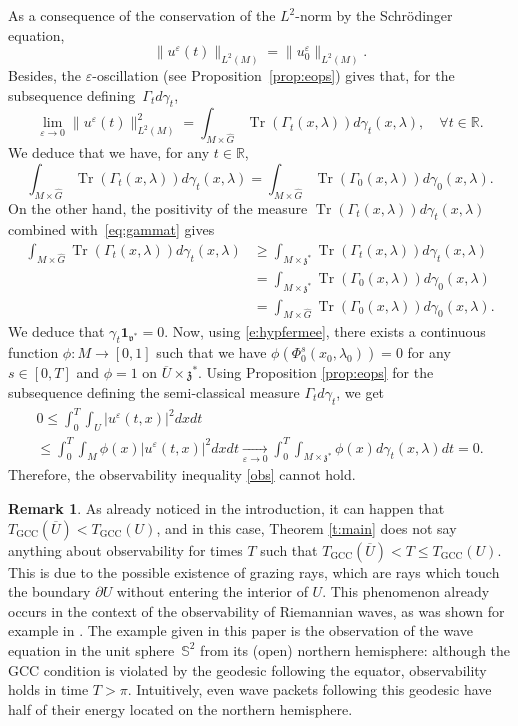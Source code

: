 \documentclass[JEP,XML,SOM,Unicode,published]{cedram}
\newcommand{\GCC}{\mathrm{GCC}}
\newcommand{\bun}{\mathbf{1}}
\DeclareMathOperator{\Tr}{Tr}
\theoremstyle{plain}
\theoremstyle{definition}
\newtheorem{remark}[theorem]{Remark}
\let\eps\varepsilon
\def\R{{\mathbb R}}
\def\bbS{{\mathbb S}}
\newcommand{\Tend}[2]{\mathbin{\mathop{\longrightarrow}\limits_{#1\to#2}}}
\begin{document}
As a consequence of the conservation of the $L^2$-norm by the Schrödinger equation,
\[
\| u^\eps(t) \|_{L^2(M)}=\| u^\eps_0\|_{L^2(M)}.
\]
Besides, the $\eps$-oscillation (see Proposition~\ref{prop:eops}) gives that, for the subsequence defining~$\Gamma_t d\gamma_t$,
\[
\lim_{\eps \to 0}\| u^\eps(t) \|^2_{L^2(M)}
= \int_{M\times \widehat G} \Tr (\Gamma_t(x,\lambda)) d\gamma_t(x,\lambda),\quad \forall t\in\R.
\]
We deduce that we have, for any $t\in\R$,
\[
\int_{M\times \widehat G} \Tr (\Gamma_t(x,\lambda)) d\gamma_t(x,\lambda)=
\int_{M\times \widehat G} \Tr (\Gamma_0(x,\lambda)) d\gamma_0(x,\lambda).
\]
On the other hand, the positivity of the measure $ \Tr (\Gamma_t(x,\lambda)) d\gamma_t(x,\lambda)$ combined with~\eqref{eq:gammat} gives
\begin{align*}\int_{M\times \widehat G} \Tr (\Gamma_t(x,\lambda)) d\gamma_t(x,\lambda)&\geq
\int_{M\times \mathfrak z^*} \Tr (\Gamma_t(x,\lambda))d\gamma_t(x,\lambda)\\
&=
\int_{M\times \mathfrak z^*} \Tr (\Gamma_0(x,\lambda))d\gamma_0(x,\lambda)\\
&=\int_{M\times \widehat G} \Tr (\Gamma_0(x,\lambda)) d\gamma_0(x,\lambda).
\end{align*}
We deduce that $\gamma_t \bun_{\mathfrak v^*}=0$. Now, using \eqref{e:hypfermee}, there exists a continuous function $\phi:M\to [0,1]$ such that we have $\phi(\Phi_0^s(x_0,\lambda_0))=0$ for any $s\in [0,T]$ and $\phi=1$ on $\overline{U}\times \mathfrak z^*$. Using Proposition \ref{prop:eops} for the subsequence defining the semi-classical measure $\Gamma_t d\gamma_t$, we get
\begin{multline*}
0\leq \int_0^{T} \int_U | u^\eps(t,x)|^2 dx dt\\[-5pt]
\leq \int_0^{T} \int_M \phi(x)| u^\eps(t,x)|^2 dx dt \Tend{\eps}{0} \int_0^{T} \int_{M\times \mathfrak z^*} \phi(x)d\gamma_t (x,\lambda) dt=0.
\end{multline*}
Therefore, the observability inequality \eqref{obs} cannot hold.
\begin{remark} \label{r:grazing}
As already noticed in the introduction, it can happen that $T_\GCC(\overline{U})<T_\GCC(U)$, and in this case, Theorem \ref{t:main} does not say anything about observability for times $T$ such that $T_\GCC(\overline{U})<T\leq T_\GCC(U)$. This is due to the possible existence of grazing rays, which are rays which touch the boundary $\partial U$ without entering the interior of $U$. This phenomenon already occurs in the context of the observability of Riemannian waves, as was shown for example in \cite[\S VI.B]{Leb2}. The example given in this paper is the observation of the wave equation in the unit sphere~$\bbS^2$ from its (open) northern hemisphere: although the GCC condition is violated by the geodesic following the equator, observability holds in time $T>\pi$. Intuitively, even wave packets following this geodesic have half of their energy located on the northern hemisphere.
\end{remark}
\end{document}
